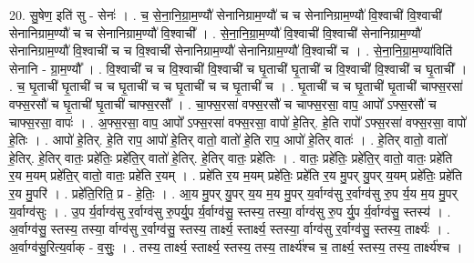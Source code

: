 \documentclass[17pt]{extarticle}
\begin{document}
20. सु॒षेण॒ इति॑ सु - सेनः॑ । . च॒ से॒ना॒नि॒ग्रा॒म॒ण्यौ॑ सेनानिग्राम॒ण्यौ॑ च च सेनानिग्राम॒ण्यौ॑ वि॒श्वाची॑ वि॒श्वाची॑ सेनानिग्राम॒ण्यौ॑ च च सेनानिग्राम॒ण्यौ॑ वि॒श्वाची᳚ । . से॒ना॒नि॒ग्रा॒म॒ण्यौ॑ वि॒श्वाची॑ वि॒श्वाची॑ सेनानिग्राम॒ण्यौ॑ सेनानिग्राम॒ण्यौ॑ वि॒श्वाची॑ च च वि॒श्वाची॑ सेनानिग्राम॒ण्यौ॑ सेनानिग्राम॒ण्यौ॑ वि॒श्वाची॑ च । . से॒ना॒नि॒ग्रा॒म॒ण्या॑विति॑ सेनानि - ग्रा॒म॒ण्यौ᳚ । . वि॒श्वाची॑ च च वि॒श्वाची॑ वि॒श्वाची॑ च घृ॒ताची॑ घृ॒ताची॑ च वि॒श्वाची॑ वि॒श्वाची॑ च घृ॒ताची᳚ । . च॒ घृ॒ताची॑ घृ॒ताची॑ च च घृ॒ताची॑ च च घृ॒ताची॑ च च घृ॒ताची॑ च । . घृ॒ताची॑ च च घृ॒ताची॑ घृ॒ताची॑ चाफ्स॒रसा॑ वफ्स॒रसौ॑ च घृ॒ताची॑ घृ॒ताची॑ चाफ्स॒रसौ᳚ । . चा॒फ्स॒रसा॑ वफ्स॒रसौ॑ च चाफ्स॒रसा॒ वाप॒ आपो᳚ ऽफ्स॒रसौ॑ च चाफ्स॒रसा॒ वापः॑ । . अ॒फ्स॒रसा॒ वाप॒ आपो᳚ ऽफ्स॒रसा॑ वफ्स॒रसा॒ वापो॑ हे॒तिर्. हे॒ति रापो᳚ ऽफ्स॒रसा॑ वफ्स॒रसा॒ वापो॑ हे॒तिः । . आपो॑ हे॒तिर्. हे॒ति राप॒ आपो॑ हे॒तिर् वातो॒ वातो॑ हे॒ति राप॒ आपो॑ हे॒तिर् वातः॑ । . हे॒तिर् वातो॒ वातो॑ हे॒तिर्. हे॒तिर् वातः॒ प्रहे॑तिः॒ प्रहे॑ति॒र् वातो॑ हे॒तिर्. हे॒तिर् वातः॒ प्रहे॑तिः । . वातः॒ प्रहे॑तिः॒ प्रहे॑ति॒र् वातो॒ वातः॒ प्रहे॑ति र॒य म॒यम् प्रहे॑ति॒र् वातो॒ वातः॒ प्रहे॑ति र॒यम् । . प्रहे॑ति र॒य म॒यम् प्रहे॑तिः॒ प्रहे॑ति र॒य मु॒पर् यु॒पर् य॒यम् प्रहे॑तिः॒ प्रहे॑ति र॒य मु॒परि॑ । . प्रहे॑ति॒रिति॒ प्र - हे॒तिः॒ । . आ॒य मु॒पर् यु॒पर् य॒य म॒य मु॒पर् य॒र्वाग्व॑सु र॒र्वाग्व॑सु रु॒प र्य॒य म॒य मु॒पर् य॒र्वाग्व॑सुः । . उ॒प र्य॒र्वाग्व॑सु र॒र्वाग्व॑सु रु॒पर्यु॒प र्य॒र्वाग्व॑सु॒ स्तस्य॒ तस्या॒ र्वाग्व॑सु रु॒प र्यु॒प र्य॒र्वाग्व॑सु॒ स्तस्य॑ । . अ॒र्वाग्व॑सु॒ स्तस्य॒ तस्या॒ र्वाग्व॑सु र॒र्वाग्व॑सु॒ स्तस्य॒ तार्क्ष्य॒ स्तार्क्ष्य॒ स्तस्या॒ र्वाग्व॑सु र॒र्वाग्व॑सु॒ स्तस्य॒ तार्क्ष्यः॑ । . अ॒र्वाग्व॑सु॒रित्य॒र्वाक् - व॒सुः॒ । . तस्य॒ तार्क्ष्य॒ स्तार्क्ष्य॒ स्तस्य॒ तस्य॒ तार्क्ष्य॑श्च च॒ तार्क्ष्य॒ स्तस्य॒ तस्य॒ तार्क्ष्य॑श्च । \newline
\end{document}
